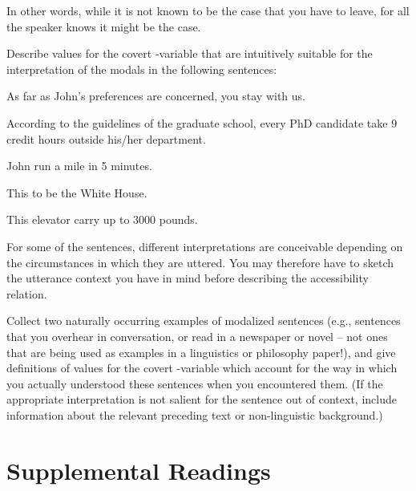 In other words, while it is not known to be the case that you have to
leave, for all the speaker knows it might be the case.
\begin{exercise}
	
	Describe values for the covert -variable that are
  intuitively suitable for the interpretation of the modals in the
  following sentences:
	
	\ex As far as John's preferences are concerned, you
   stay with us. \xe
	
	\ex According to the guidelines of the graduate school, every PhD
  candidate  take 9 credit hours outside his/her
  department. \xe
	
	\ex John  run a mile in 5 minutes. \xe
	
	\ex This  to be the White House. \xe
	
	\ex This elevator  carry up to 3000 pounds. \xe
	
	For some of the sentences, different interpretations are conceivable
  depending on the circumstances in which they are uttered. You may
  therefore have to sketch the utterance context you have in mind
  before describing the accessibility relation. \eex
\end{exercise}
\begin{exercise}
	
	Collect two naturally occurring examples of modalized sentences
  (e.g., sentences that you overhear in conversation, or read in a
  newspaper or novel -- not ones that are being used as examples in a
  linguistics or philosophy paper!), and give definitions of values
  for the covert -variable which account for the way in
  which you actually understood these sentences when you encountered
  them. (If the appropriate interpretation is not salient for the
  sentence out of context, include information about the relevant
  preceding text or non-linguistic background.) \eex
\end{exercise}


\section{Supplemental Readings} \label{sec:suppl-read-modals}

